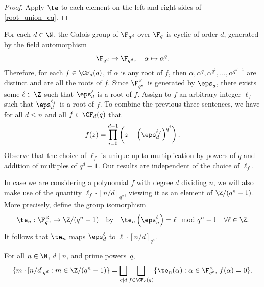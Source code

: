 \begin{proof}
Apply \(\te\) to each element on the left and right sides of \eqref{root_union_eq}.
\end{proof}




For each \(d \in \N\), the Galois group of \(\F_{q^d}\) over \(\F_q\) is cyclic of order \(d\), generated by the field automorphism
\[
\F_{q^d} \to \F_{q^d}, \quad \alpha \mapsto \alpha^q.
\]
Therefore, for each \(f \in \CF_d (q)\), if \(\alpha\) is any root of \(f\), then
\(\alpha,\alpha^q,\alpha^{q^2},\ldots,\alpha^{q^{d-1}}\)
are distinct and are all the roots of \(f\).
Since \(\F_{q^d}^\times\) is generated by \(\eps_d\), there exists some \(\ell \in \Z\) such that \(\eps_d^\ell\) is a root of \(f\).
Assign to \(f\) an arbitrary integer \(\ell_f\) such that \(\eps_d^{\ell_f}\) is a root of \(f\).
To combine the previous three sentences,
we have for all \(d \leq n\) and all \(f \in \CF_d(q)\) that
\begin{equation}
\label{who_are_my_roots}
f(z) = \prod_{i=0}^{d-1}
\left (
z - \left ( \eps_d^{\ell_f} \right )^{q^i}
\right ).
\end{equation}
Observe that the choice of \(\ell_f\) is unique up to multiplication by powers of \(q\) and addition of multiples of \(q^d - 1\).
Our results are independent of the choice of \(\ell_f\).

In case we are considering a polynomial \(f\) with degree \(d\) dividing \(n\), we will also make use of the quantity \(\ell_f \cdot [n/d]_{q^d}\), viewing it as an element of \(\Z / (q^n-1)\).
More precisely, define the group isomorphism
\begin{equation}
\label{te_n_def}
\te_n : \F_{q^n}^\times \to \Z / (q^n-1)
\quad \text{by} \quad
\te_n \left ( \eps_n^{\ell} \right ) = \ell \mod q^n-1
\quad
\forall \ell \in \Z.
\end{equation}
It follows that
\(\te_n\) maps \(\eps_d^{\ell}\) to \(\ell \cdot [n/d]_{q^d}\).

\begin{corollary}
\label{te_n_map_property}
For all \(n \in \N\), \(d \mid n\), and prime powers~\(q\),
\begin{equation}
\{ m \cdot [n/d]_{q^d} : m \in \Z / (q^n-1) \}
=
\bigsqcup_{c \mid d}
\bigsqcup_{f \in \CF_c (q)}
\{\te_n(\alpha) : \alpha \in \F_{q^c}^\times, \,  f(\alpha) = 0\}.
\end{equation}
\end{corollary}

